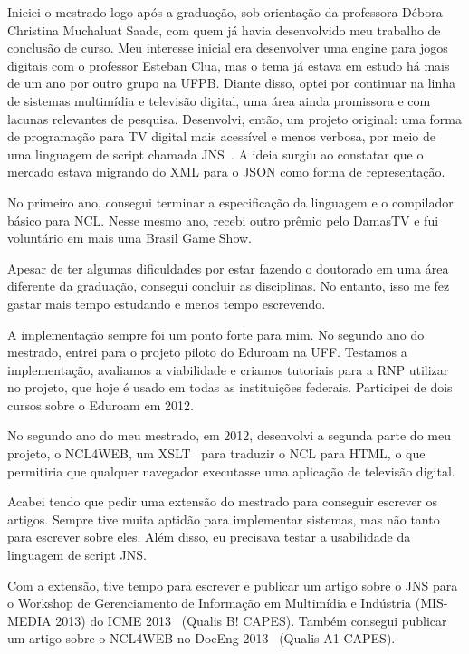 \documentclass[10pt,a4paper,oneside]{book}
\begin{document}
Iniciei o mestrado logo após a graduação, sob orientação da professora Débora Christina Muchaluat Saade, com quem já
havia desenvolvido meu trabalho de conclusão de curso. Meu interesse inicial era desenvolver uma engine para jogos digitais com o professor Esteban Clua,
mas o tema já estava em estudo há mais de um ano por outro grupo na UFPB. Diante disso, optei por continuar na linha de
sistemas multimídia e televisão digital, uma área ainda promissora e com lacunas relevantes de pesquisa.
Desenvolvi, então, um projeto original: uma forma de programação para TV digital mais acessível e menos verbosa, por
meio de uma linguagem de script chamada JNS~\cite{silva2013jnsieee}. A ideia surgiu ao constatar que o mercado estava
migrando do XML para o JSON como forma de representação.

No primeiro ano, consegui terminar a especificação da linguagem e o compilador básico para NCL. Nesse mesmo ano,
recebi outro prêmio pelo DamasTV e fui voluntário em mais uma Brasil Game Show.

Apesar de ter algumas dificuldades por estar fazendo o doutorado em uma área diferente da graduação, consegui concluir
as disciplinas. No entanto, isso me fez gastar mais tempo estudando e menos tempo escrevendo.

A implementação sempre foi um ponto forte para mim. No segundo ano do mestrado, entrei para o projeto piloto do Eduroam
na UFF. Testamos a implementação, avaliamos a viabilidade e criamos tutoriais para a RNP utilizar no projeto, que hoje
é usado em todas as instituições federais. Participei de dois cursos sobre o Eduroam em 2012.

No segundo ano do meu mestrado, em 2012, desenvolvi a segunda parte do meu projeto, o NCL4WEB, um
XSLT~\cite{clark1999xsl} para traduzir o NCL para HTML, o que permitiria que qualquer navegador executasse uma
aplicação de televisão digital.

Acabei tendo que pedir uma extensão do mestrado para conseguir escrever os artigos. Sempre tive muita aptidão para
implementar sistemas, mas não tanto para escrever sobre eles. Além disso, eu precisava testar a usabilidade da
linguagem de script JNS.

Com a extensão, tive tempo para escrever e publicar um artigo sobre o JNS para o Workshop de Gerenciamento de
Informação em Multimídia e Indústria (MIS-MEDIA 2013) do ICME 2013~\cite{silva2013jnsieee} (Qualis B! CAPES).
Também consegui publicar um artigo sobre o NCL4WEB no DocEng 2013~\cite{silva2013ncl4web} (Qualis A1 CAPES).
\end{document}
